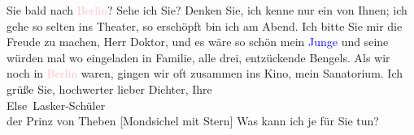                Sie bald nach \textcolor{pink}{Berlin}{}\ledrightnote{\textcolor{pink}{Berlin}}? Sehe ich Sie? Denken Sie,
               ich kenne nur ein \label{K_L02653-8v}\label{K_L02653-8h} von Ihnen; ich gehe
               so selten ins Theater, so erschöpft bin ich am Abend. Ich bitte Sie mir die Freude zu
               machen, Herr Doktor, und es wäre so schön mein \textcolor{blue}{Junge}{} und seine \label{K_L02653-9v}\label{K_L02653-9h} würden mal wo
               eingeladen in Familie, alle drei, entzückende Bengels. Als wir noch in \textcolor{pink}{Berlin}{}\ledrightnote{\textcolor{pink}{Berlin}} waren, gingen wir oft zusammen ins Kino,
               mein Sanatorium. Ich grüße Sie, hochwerter lieber Dichter, Ihre {\\}\spacefill\mbox{Else Lasker-Schüler}{ }{\\}der Prinz von Theben {[}Mondsichel mit
                  Stern{]}\pend
           \pstart
           \noindent{}Was kann ich je für Sie tun?\pend
           \pstart
           {\pb}\label{T_L02653-1v}\label{T_L02653-1h}\pend
           \endnumbering{}  
      